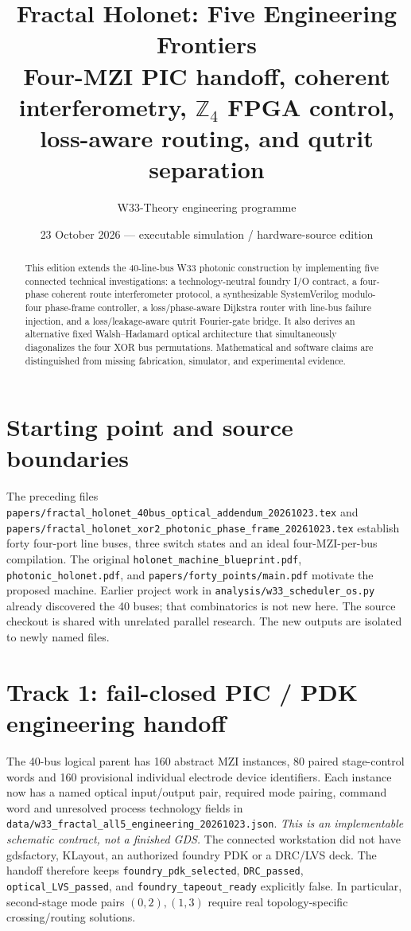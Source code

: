 \documentclass[10pt]{article}
\title{\textbf{Fractal Holonet: Five Engineering Frontiers}\\
Four-MZI PIC handoff, coherent interferometry, $ \mathbb{Z}_4 $ FPGA control, loss-aware routing, and qutrit separation}
\author{W33-Theory engineering programme}
\date{23 October 2026 --- executable simulation / hardware-source edition}
\begin{document}
\maketitle
\begin{abstract}
This edition extends the 40-line-bus W33 photonic construction by implementing
five connected technical investigations: a technology-neutral foundry I/O
contract, a four-phase coherent route interferometer protocol, a
synthesizable SystemVerilog modulo-four phase-frame controller, a
loss/phase-aware Dijkstra router with line-bus failure injection,
and a loss/leakage-aware qutrit Fourier-gate bridge. It also
derives an alternative fixed Walsh--Hadamard optical architecture
that simultaneously diagonalizes the four XOR bus permutations.
Mathematical and software claims are distinguished from missing
fabrication, simulator, and experimental evidence.
\end{abstract}
\tableofcontents
\section{Starting point and source boundaries}
The preceding files
\texttt{papers/fractal\_holonet\_40bus\_optical\_addendum\_20261023.tex}
and \texttt{papers/fractal\_holonet\_xor2\_photonic\_phase\_frame\_20261023.tex}
establish forty four-port line buses, three switch states and an ideal
four-MZI-per-bus compilation. The original
\texttt{holonet\_machine\_blueprint.pdf},
\texttt{photonic\_holonet.pdf}, and
\texttt{papers/forty\_points/main.pdf} motivate the proposed machine.
Earlier project work in \texttt{analysis/w33\_scheduler\_os.py}
already discovered the 40 buses; that combinatorics is not new here.
The source checkout is shared with unrelated parallel research. The
new outputs are isolated to newly named files.

\section{Track 1: fail-closed PIC / PDK engineering handoff}
The 40-bus logical parent has 160 abstract MZI instances,
80 paired stage-control words and 160 provisional individual
electrode device identifiers. Each instance now has a named
optical input/output pair, required mode pairing, command word
and unresolved process technology fields in
\texttt{data/w33\_fractal\_all5\_engineering\_20261023.json}.
\emph{This is an implementable schematic contract, not a finished GDS.}
The connected workstation did not have gdsfactory, KLayout,
an authorized foundry PDK or a DRC/LVS deck. The handoff
therefore keeps \texttt{foundry\_pdk\_selected},
\texttt{DRC\_passed}, \texttt{optical\_LVS\_passed}, and
\texttt{foundry\_tapeout\_ready} explicitly false. In
particular, second-stage mode pairs $(0,2),(1,3)$
require real topology-specific crossing/routing solutions.
\end{document}

